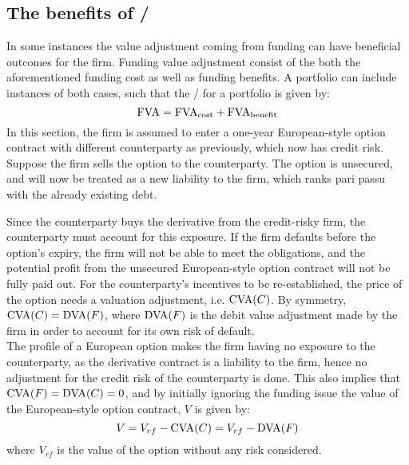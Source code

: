 \documentclass[../main.tex]{subfiles}
\begin{document}
    \subsection{The benefits of \FVA/}
        In some instances the value adjustment coming from funding can have beneficial outcomes for the firm. Funding value adjustment consist of the both the aforementioned funding cost as well as funding benefits. A portfolio can include instances of both cases, such that the \FVA/ for a portfolio is given by:
        \begin{equation}
            \text{\FVA/} = \text{\FVA/}_{\text{cost}} + \text{\FVA/}_{\text{benefit}}
        \end{equation}
        In this section, the firm is assumed to enter a one-year European-style option contract with different counterparty as previously,
        which now has credit risk.
        Suppose the firm sells the option to the counterparty. The option is unsecured, and will now be treated as a new liability to the firm, which ranks pari passu with the already existing debt.

        Since the counterparty buys the derivative from the credit-risky firm, the counterparty must account for this exposure. If the firm defaults before the option's expiry, the firm will not be able to meet the obligations, and the potential profit from the unsecured European-style option contract will not be fully paid out. For the counterparty's incentives to be re-established, the price of the option needs a valuation adjustment, i.e. $\text{\CVA/}(C)$. By symmetry, $\text{\CVA/}(C) = \text{\DVA/}(F)$, where $\text{\DVA/}(F)$ is the debit value adjustment made by the firm in order to account for its own risk of default.\\
        The profile of a European option makes the firm having no exposure to the counterparty, as the derivative contract is a liability to the firm, hence no adjustment for the credit risk of the counterparty is done. This also implies that $\text{\CVA/}(F) = \text{\DVA/}(C) = 0$, and by initially ignoring the funding issue the value of the European-style option contract, $V$ is given by:
        \begin{equation}\label{eqn:option-value-credit-risk}
            V = V_{rf} - \text{\CVA/}(C) = V_{rf} - \text{\DVA/}(F)
        \end{equation}
        where $V_{rf}$ is the value of the option without any risk considered.
\end{document}

